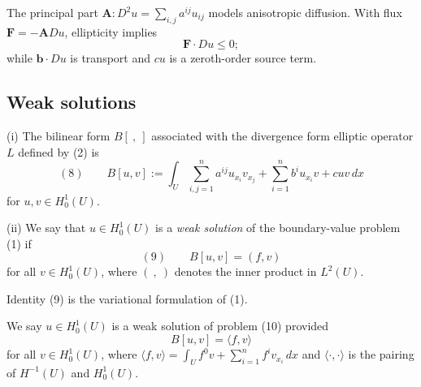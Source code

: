\begin{remark}
\label{rem:elliptic-pde-physical-interpretation}
The principal part $\mathbf A:D^2u=\sum_{i,j}a^{ij}u_{ij}$ models anisotropic diffusion. With flux $\mathbf F=-\mathbf A Du$, ellipticity implies
$$\mathbf F \cdot Du \leq 0;$$
while $\mathbf b\cdot Du$ is transport and $cu$ is a zeroth-order source term.
\end{remark}

\subsection{Weak solutions}

\begin{definition}
\label{def:bilinear-form-weak-solution-l2}
(i) The bilinear form $B[\ ,\ ]$ associated with the divergence form elliptic operator $L$ defined by (2) is
$$(8) \qquad B[u,v] := \int_U \sum_{i,j=1}^n a^{ij}u_{x_i}v_{x_j} + \sum_{i=1}^n b^iu_{x_i}v + cuv \, dx$$
for $u,v \in H_0^1(U)$.

(ii) We say that $u \in H_0^1(U)$ is a \textit{weak solution} of the boundary-value problem (1) if
$$(9) \qquad B[u,v] = (f,v)$$
for all $v \in H_0^1(U)$, where $(\ ,\ )$ denotes the inner product in $L^2(U)$.
\end{definition}

\begin{remark}
\label{rem:variational-formulation}
Identity (9) is the variational formulation of (1).
\end{remark}

\begin{definition}
\label{def:weak-solution-elliptic-bvp}
We say $u \in H_0^1(U)$ is a weak solution of problem (10) provided
$$B[u,v] = \langle f,v \rangle$$
for all $v \in H_0^1(U)$, where $\langle f,v \rangle = \int_U f^0 v + \sum_{i=1}^n f^i v_{x_i} \, dx$ and $\langle \cdot,\cdot \rangle$ is the pairing of $H^{-1}(U)$ and $H_0^1(U)$.
\end{definition}

